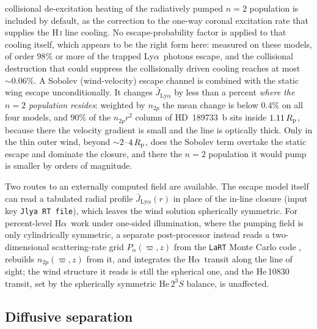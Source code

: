\documentclass[twocolumn]{aastex702}
\newcommand{\Rp}{R_{\rm p}}
\newcommand{\HeTS}{\mathrm{He}\,2^{3}S}
\newcommand{\Lya}{\mbox{Ly}\ensuremath{\alpha}}
\newcommand{\Ha}{\mbox{H}\ensuremath{\alpha}}
\begin{document}
collisional de-excitation heating of the radiatively pumped $n=2$ population is included by
default, as the correction to the one-way coronal excitation rate that supplies the
\mbox{H\,\textsc{i}} line cooling. No escape-probability factor is applied to that cooling
itself, which appears to be the right form here: measured on these models, of order $98\%$
or more of the trapped \Lya\ photons escape, and the collisional destruction that could
suppress the collisionally driven cooling reaches at most ${\sim}0.06\%$. A Sobolev
(wind-velocity) escape channel is combined with the static wing escape unconditionally. It
changes $\bar{J}_{\Lya}$ by less than a percent \emph{where the $n=2$ population resides}:
weighted by $n_{2p}$ the mean change is below $0.4\%$ on all four models, and $90\%$
of the $n_{2p}r^2$ column of HD~189733~b sits inside $1.11\,\Rp$, because there the
velocity gradient is small and the line is optically thick. Only in the thin outer wind,
beyond ${\sim}2$--$4\,\Rp$, does the Sobolev term overtake the static escape and dominate
the closure, and there the $n=2$ population it would pump is smaller by orders of
magnitude.

Two routes to an externally computed field are available. The escape model itself can read
a tabulated radial profile $\bar{J}_{\Lya}(r)$ in place of the in-line closure (input key
\texttt{Jlya RT file}), which leaves the wind solution spherically symmetric. For
percent-level \Ha\ work under one-sided illumination, where the pumping field is only
cylindrically symmetric, a separate post-processor instead reads a two-dimensional
scattering-rate grid $P_\alpha(\varpi,z)$ from the \texttt{LaRT} Monte Carlo code
\citep{SeonKim2020}, rebuilds $n_{2p}(\varpi,z)$ from it, and integrates the \Ha\ transit
along the line of sight; the wind structure it reads is still the spherical one, and the
\mbox{He\,10830} transit, set by the spherically symmetric $\HeTS$ balance, is unaffected.

\subsection{Diffusive separation}
\label{sec:diffusion}
\end{document}
